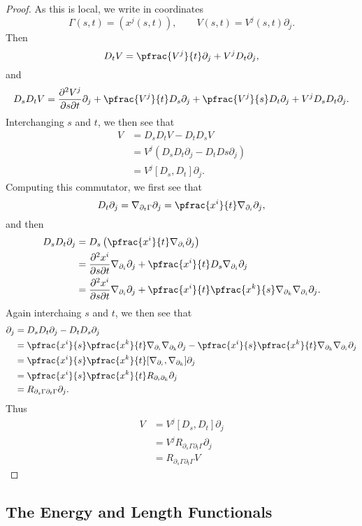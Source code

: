 \begin{proof}
As this is local, we write in coordinates
$$\Gamma(s,t)=(x^j(s,t)),\qquad V(s,t)=V^j(s,t)\partial_j.$$
Then
$$D_tV=\pfrac{V^j}{t}\partial_j+V^jD_t\partial_j,$$
and
$$D_sD_tV=\frac{\partial^2 V^j}{\partial s\partial t}\partial_j+\pfrac{V^j}{t}D_s\partial_j+\pfrac{V^j}{s}D_t\partial_j+V^jD_sD_t\partial_j.$$
Interchanging $s$ and $t$, we then see that
\begin{align*}
	[D_s,D_t]V&=D_sD_tV-D_tD_sV\\
	&=V^j(D_sD_t\partial_j-D_tDs\partial_j)\\
	&=V^j[D_s,D_t]\partial_j.
\end{align*}
Computing this commutator, we first see that
$$D_t\partial_j=\nabla_{\partial_t\Gamma}\partial_j=\pfrac{x^i}{t}\nabla_{\partial_i}\partial_j,$$
and then
\begin{align*}
	D_sD_t\partial_j&=D_s\left(\pfrac{x^i}{t	}\nabla_{\partial_i}\partial_j\right)\\
	&=\frac{\partial^2 x^i}{\partial s\partial t}\nabla_{\partial_i}\partial_j+\pfrac{x^i}{t}D_s\nabla_{\partial_i}\partial_j\\
	&=\frac{\partial^2 x^i}{\partial s\partial t}\nabla_{\partial_i}\partial_j+\pfrac{x^i}{t}\pfrac{x^k}{s}\nabla_{\partial_k}\nabla_{\partial_i}\partial_j.
\end{align*}
Again interchaing $s$ and $t$, we then see that
\begin{align*}
	[D_s,D_t]\partial_j&=D_sD_t\partial_j-D_tD_s\partial_j\\
	&=\pfrac{x^i}{s}\pfrac{x^k}{t}\nabla_{\partial_i}\nabla_{\partial_k}\partial_j-\pfrac{x^i}{s}\pfrac{x^k}{t}\nabla_{\partial_k}\nabla_{\partial_i}\partial_j\\
	&=\pfrac{x^i}{s}\pfrac{x^k}{t}[\nabla_{\partial_i},\nabla_{\partial_k}]\partial_j\\
	&=\pfrac{x^i}{s}\pfrac{x^k}{t}R_{\partial_i\partial_k}\partial_j\\
	&=R_{\partial_s\Gamma\partial_t\Gamma}\partial_j.
\end{align*}
Thus
\begin{align*}
	[D_s,D_t]V&=V^j[D_s,D_t]\partial_j\\
	&=V^jR_{\partial_s\Gamma\partial_t\Gamma}\partial_j\\
	&=R_{\partial_s\Gamma\partial_t\Gamma}V
\end{align*}
\end{proof}




\subsection{The Energy and Length Functionals}

